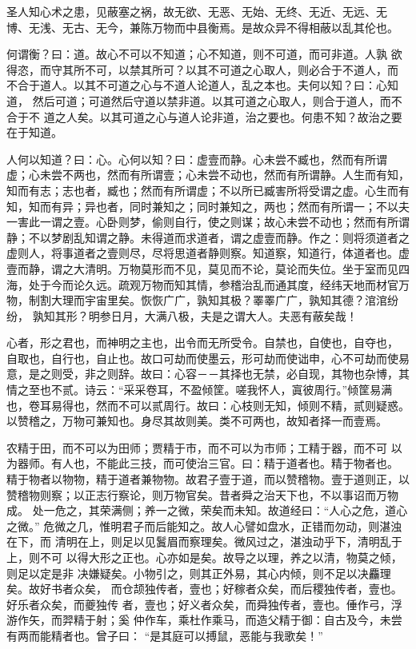 圣人知心术之患，见蔽塞之祸，故无欲、无恶、无始、无终、无近、无远、无 博、无浅、无古、无今，兼陈万物而中县衡焉。是故众异不得相蔽以乱其伦也。

何谓衡？曰：道。故心不可以不知道；心不知道，则不可道，而可非道。人孰 欲得恣，而守其所不可，以禁其所可？以其不可道之心取人，则必合于不道人，而 不合于道人。以其不可道之心与不道人论道人，乱之本也。夫何以知？曰：心知道， 然后可道；可道然后守道以禁非道。以其可道之心取人，则合于道人，而不合于不 道之人矣。以其可道之心与道人论非道，治之要也。何患不知？故治之要在于知道。

人何以知道？曰：心。心何以知？曰：虚壹而静。心未尝不臧也，然而有所谓 虚；心未尝不两也，然而有所谓壹；心未尝不动也，然而有所谓静。人生而有知， 知而有志；志也者，臧也；然而有所谓虚；不以所已臧害所将受谓之虚。心生而有 知，知而有异；异也者，同时兼知之；同时兼知之，两也；然而有所谓一；不以夫 一害此一谓之壹。心卧则梦，偷则自行，使之则谋；故心未尝不动也；然而有所谓 静；不以梦剧乱知谓之静。未得道而求道者，谓之虚壹而静。作之：则将须道者之 虚则人，将事道者之壹则尽，尽将思道者静则察。知道察，知道行，体道者也。虚 壹而静，谓之大清明。万物莫形而不见，莫见而不论，莫论而失位。坐于室而见四 海，处于今而论久远。疏观万物而知其情，参稽治乱而通其度，经纬天地而材官万 物，制割大理而宇宙里矣。恢恢广广，孰知其极？睪睪广广，孰知其德？涫涫纷纷， 孰知其形？明参日月，大满八极，夫是之谓大人。夫恶有蔽矣哉！

心者，形之君也，而神明之主也，出令而无所受令。自禁也，自使也，自夺也， 自取也，自行也，自止也。故口可劫而使墨云，形可劫而使诎申，心不可劫而使易 意，是之则受，非之则辞。故曰：心容－－其择也无禁，必自现，其物也杂博，其 情之至也不贰。诗云：“采采卷耳，不盈倾筐。嗟我怀人，寘彼周行。”倾筐易满 也，卷耳易得也，然而不可以贰周行。故曰：心枝则无知，倾则不精，贰则疑惑。 以赞稽之，万物可兼知也。身尽其故则美。类不可两也，故知者择一而壹焉。

农精于田，而不可以为田师；贾精于市，而不可以为市师；工精于器，而不可 以为器师。有人也，不能此三技，而可使治三官。曰：精于道者也。精于物者也。 精于物者以物物，精于道者兼物物。故君子壹于道，而以赞稽物。壹于道则正，以 赞稽物则察；以正志行察论，则万物官矣。昔者舜之治天下也，不以事诏而万物成。 处一危之，其荣满侧；养一之微，荣矣而未知。故道经曰：“人心之危，道心之微。” 危微之几，惟明君子而后能知之。故人心譬如盘水，正错而勿动，则湛浊在下，而 清明在上，则足以见鬒眉而察理矣。微风过之，湛浊动乎下，清明乱于上，则不可 以得大形之正也。心亦如是矣。故导之以理，养之以清，物莫之倾，则足以定是非 决嫌疑矣。小物引之，则其正外易，其心内倾，则不足以决麤理矣。故好书者众矣， 而仓颉独传者，壹也；好稼者众矣，而后稷独传者，壹也。好乐者众矣，而夔独传 者，壹也；好义者众矣，而舜独传者，壹也。倕作弓，浮游作矢，而羿精于射；奚 仲作车，乘杜作乘马，而造父精于御：自古及今，未尝有两而能精者也。曾子曰： “是其庭可以搏鼠，恶能与我歌矣！”

